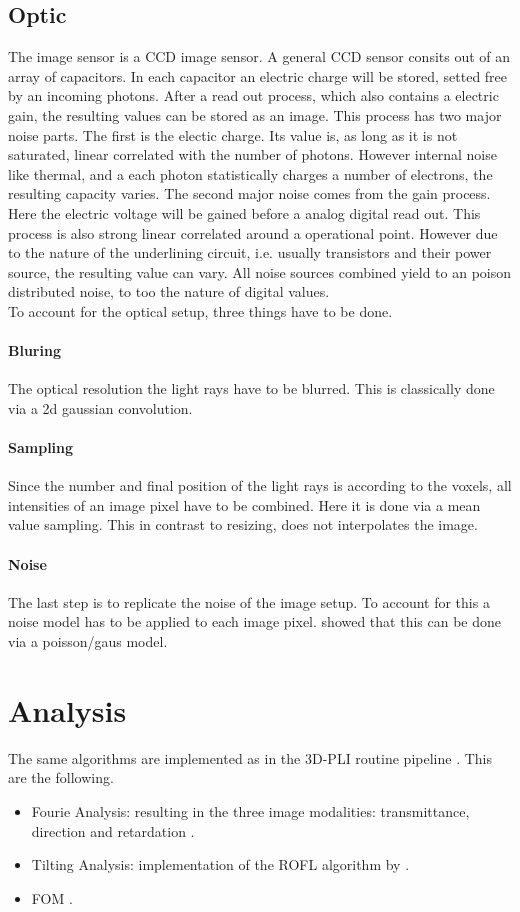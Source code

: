\subsection{Optic}
\label{sec:ccdOptic}
% 
The image sensor is a \ac{CCD} image sensor.
A general \ac{CCD} sensor consits out of an array of capacitors.
In each capacitor an electric charge will be stored, setted free by an incoming photons.
After a read out process, which also contains a electric gain, the resulting values can be stored as an image.
This process has two major noise parts. The first is the electic charge.
Its value is, as long as it is not saturated, linear correlated with the number of photons.
However internal noise like thermal, and a each photon statistically charges a number of electrons, the resulting capacity varies.
The second major noise comes from the gain process.
Here the electric voltage will be gained before a analog digital read out.
This process is also strong linear correlated around a operational point.
However due to the nature of the underlining circuit, i.e. usually transistors and their power source, the resulting value can vary.
All noise sources combined yield to an poison distributed noise, to too the nature of digital values.
%
\\
%
To account for the optical setup, three things have to be done.
\paragraph{Bluring}
The optical resolution the light rays have to be blurred.
This is classically done via a 2d gaussian convolution.
\paragraph{Sampling}
Since the number and final position of the light rays is according to the voxels, all intensities of an image pixel have to be combined.
Here it is done via a mean value sampling.
This in contrast to resizing, does not interpolates the image.
% 
\paragraph{Noise}
The last step is to replicate the noise of the image setup. To account for this a noise model has to be applied to each image pixel. \cite{Wiese:887678} showed that this can be done via a poisson/gaus model.
% 
\section{Analysis}
% 
The same algorithms are implemented as in the \ac{3D-PLI} routine pipeline \dummy[-> theory]{}.
This are the following.
% 
\begin{itemize}
  \item Fourie Analysis: resulting in the three image modalities: transmittance, direction and retardation \dummy{}. 
  \item Tilting Analysis: implementation of the \ac{ROFL} algorithm by \cite{Schmitz2018} \dummy{}. 
  \item \ac{FOM} \dummy{}. 
\end{itemize}
% 
